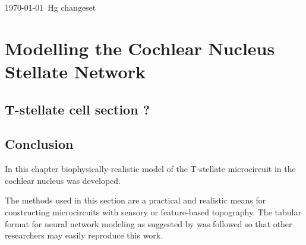 \documentclass[11pt,a4paper,twoside,openright]{book}
\begin{document}

		{%
			\singlespacing%
                        \listoftodos
			\tableofcontents%
                        \printglossary
		   \clearpage%
		}%

{\today\ Hg changeset }

\setcounter{chapter}{2}
\chapter[Simple Responses]{Modelling the Cochlear Nucleus Stellate Network}
\label{sec:SimpleResponsesChapter}




\newpage


\newpage


\newpage



\section{T-stellate cell section ? } %
\newpage


\section{Conclusion}

In this chapter biophysically-realistic model of the
T-stellate microcircuit in the cochlear nucleus was developed.


The methods used in this section are a practical and realistic means
for constructing microcircuits with sensory or feature-based
topography.  The tabular format for neural network modeling as
suggested by \citet{NordlieGewaltigEtAl:2009} was followed so that other
researchers may easily reproduce this work. 


\appendix


 
\end{document}
